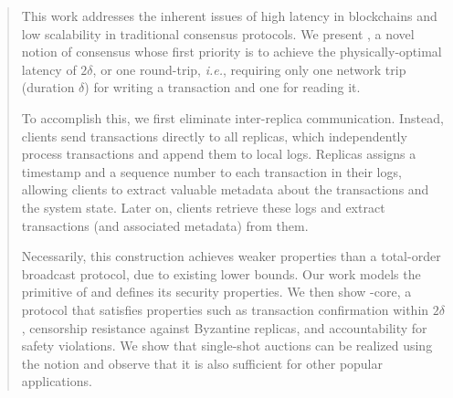 \begin{abstract}
This work addresses the inherent issues of high latency in blockchains and low scalability in traditional consensus protocols.
We present \podtm, a novel notion of consensus whose first priority is to achieve the physically-optimal latency of $2\delta$, or one round-trip, \textit{i.e.}, requiring only one network trip (duration $\delta$) for writing a transaction and one for reading it.

To accomplish this, we first eliminate inter-replica communication. Instead, clients send transactions directly to all replicas, which independently process transactions and append them to local logs.
Replicas assigns a timestamp and a sequence number to each transaction in their logs, allowing clients to extract valuable metadata about the transactions and the system state. Later on, clients retrieve these logs and extract transactions (and associated metadata) from them.

Necessarily, this construction achieves weaker properties than a total-order broadcast protocol, due to existing lower bounds.
Our work models the primitive of \podtm and defines its security properties.
We then show \podtm-core, a protocol that satisfies properties such as transaction confirmation within $2\delta$, censorship resistance against Byzantine replicas, and accountability for safety violations. We show that single-shot auctions can be realized using the \podtm notion and observe that it is also sufficient for other popular applications.




\end{abstract}

